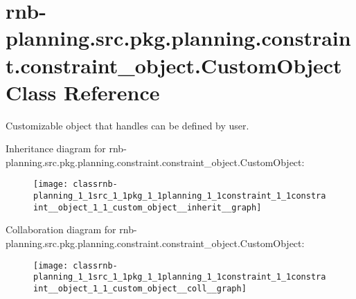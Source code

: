 \hypertarget{classrnb-planning_1_1src_1_1pkg_1_1planning_1_1constraint_1_1constraint__object_1_1_custom_object}{}\section{rnb-\/planning.src.\+pkg.\+planning.\+constraint.\+constraint\+\_\+object.\+Custom\+Object Class Reference}
\label{classrnb-planning_1_1src_1_1pkg_1_1planning_1_1constraint_1_1constraint__object_1_1_custom_object}


Customizable object that handles can be defined by user.  




Inheritance diagram for rnb-\/planning.src.\+pkg.\+planning.\+constraint.\+constraint\+\_\+object.\+Custom\+Object\+:\nopagebreak
\begin{figure}[H]
\begin{center}
\leavevmode
\texttt{[image: classrnb-planning\_1\_1src\_1\_1pkg\_1\_1planning\_1\_1constraint\_1\_1constraint\_\_object\_1\_1\_custom\_object\_\_inherit\_\_graph]}
\end{center}
\end{figure}


Collaboration diagram for rnb-\/planning.src.\+pkg.\+planning.\+constraint.\+constraint\+\_\+object.\+Custom\+Object\+:\nopagebreak
\begin{figure}[H]
\begin{center}
\leavevmode
\texttt{[image: classrnb-planning\_1\_1src\_1\_1pkg\_1\_1planning\_1\_1constraint\_1\_1constraint\_\_object\_1\_1\_custom\_object\_\_coll\_\_graph]}
\end{center}
\end{figure}
